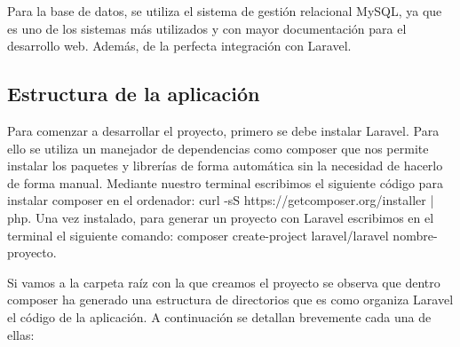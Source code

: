 \vspace{5 mm}

Para la base de datos, se utiliza el sistema de gestión relacional MySQL, ya que es uno de los sistemas más utilizados y con mayor documentación para el
desarrollo web. Además, de la perfecta integración con Laravel.

\subsection{Estructura de la aplicación}

Para comenzar a desarrollar el proyecto, primero se debe instalar Laravel. Para ello se utiliza un manejador de dependencias como composer que nos
permite instalar los paquetes y librerías de forma automática sin la necesidad de hacerlo de forma manual. Mediante nuestro terminal escribimos el
siguiente código para instalar composer en el ordenador: curl -sS https://getcomposer.org/installer | php. Una vez instalado, para
generar un proyecto con Laravel escribimos en el terminal el siguiente comando: composer create-project laravel/laravel nombre-proyecto.

\vspace{5 mm}

Si vamos a la carpeta raíz con la que creamos el proyecto se observa que dentro composer ha generado una estructura de directorios que es como organiza
Laravel el código de la aplicación. A continuación se detallan brevemente cada una de ellas:

